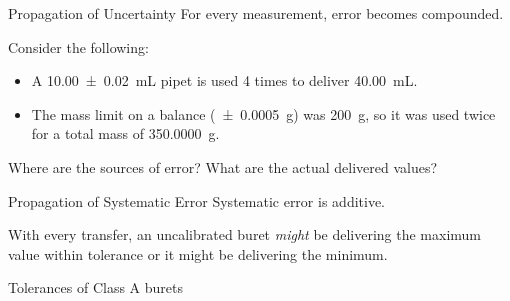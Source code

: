 \documentclass[handout]{beamer}
\begin{document}
\begin{frame}{Propagation of Uncertainty}
	For every measurement, error becomes compounded.

	\bigskip

	\begin{example}
	Consider the following:
	\begin{itemize}
		\item A \SI{10.00(2)}{\mL} pipet is used 4 times to deliver \SI{40.00}{\mL}.
		\item The mass limit on a balance (\SI{\pm0.0005}{\gram}) was \SI{200}{\gram}, so it was used twice for
			a total mass of \SI{350.0000}{\gram}.
	\end{itemize}
	\end{example}

	\bigskip

	Where are the sources of error? What are the actual delivered values?
\end{frame}

\begin{frame}[t]{Propagation of Systematic Error}
	\alert{Systematic error} is additive.

	With every transfer, an \alert{uncalibrated} buret \emph{might} be delivering the maximum value within tolerance
	or it might be delivering the minimum.

	\bigskip

\begin{block}{Tolerances of Class A burets}
	\centering
\end{block}
\end{frame}
\end{document}
